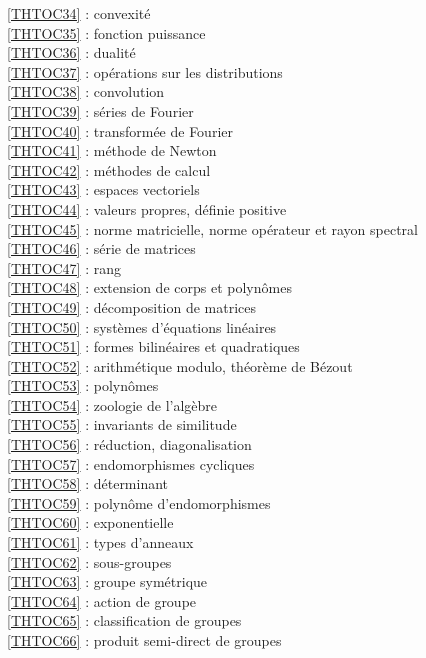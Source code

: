 \ref {THTOC34} : convexité\\
\ref {THTOC35} : fonction puissance\\
\ref {THTOC36} : dualité\\
\ref {THTOC37} : opérations sur les distributions\\
\ref {THTOC38} : convolution\\
\ref {THTOC39} : séries de Fourier\\
\ref {THTOC40} : transformée de Fourier\\
\ref {THTOC41} : méthode de Newton\\
\ref {THTOC42} : méthodes de calcul\\
\ref {THTOC43} : espaces vectoriels\\
\ref {THTOC44} : valeurs propres, définie positive\\
\ref {THTOC45} : norme matricielle, norme opérateur et rayon spectral\\
\ref {THTOC46} : série de matrices\\
\ref {THTOC47} : rang\\
\ref {THTOC48} : extension de corps et polynômes\\
\ref {THTOC49} : décomposition de matrices\\
\ref {THTOC50} : systèmes d'équations linéaires\\
\ref {THTOC51} : formes bilinéaires et quadratiques\\
\ref {THTOC52} : arithmétique modulo, théorème de Bézout\\
\ref {THTOC53} : polynômes\\
\ref {THTOC54} : zoologie de l'algèbre\\
\ref {THTOC55} : invariants de similitude\\
\ref {THTOC56} : réduction, diagonalisation\\
\ref {THTOC57} : endomorphismes cycliques\\
\ref {THTOC58} : déterminant\\
\ref {THTOC59} : polynôme d'endomorphismes\\
\ref {THTOC60} : exponentielle\\
\ref {THTOC61} : types d'anneaux\\
\ref {THTOC62} : sous-groupes\\
\ref {THTOC63} : groupe symétrique\\
\ref {THTOC64} : action de groupe\\
\ref {THTOC65} : classification de groupes\\
\ref {THTOC66} : produit semi-direct de groupes\\
